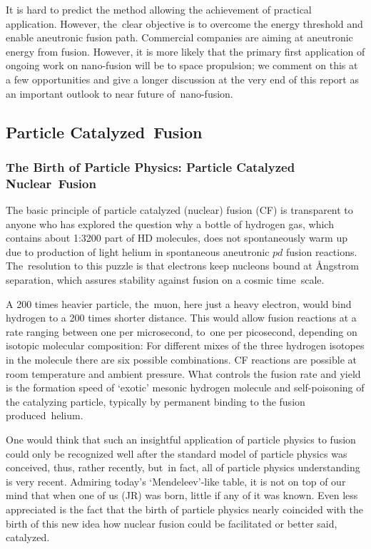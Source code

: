 \documentclass[particles,article,accept,pdftex,moreauthors]{Definitions/mdpi}
\begin{document}
It is hard to predict the method allowing the achievement of practical application. However, the~clear objective is to overcome the energy threshold and enable aneutronic fusion path. Commercial companies are aiming at aneutronic energy from fusion. However, it is more likely that the primary first application of ongoing work on nano-fusion will be to space propulsion; we comment on this at a few opportunities and give a longer discussion at the very end of this report as an important outlook to near future of~nano-fusion. 

\subsection{Particle Catalyzed~Fusion}\label{ssec:INTmuCF}
\subsubsection{The Birth of Particle Physics: Particle Catalyzed Nuclear~Fusion}\label{sssec:particles}

The basic principle of particle catalyzed (nuclear) fusion (CF) is transparent to anyone who has explored the question why a bottle of hydrogen gas, which contains about 1:3200 part of HD molecules, does not spontaneously warm up due to production of light helium in spontaneous aneutronic $pd$ fusion reactions. The~resolution to this puzzle is that electrons keep nucleons bound at \AA ngstrom separation, which assures stability against fusion on a cosmic time~scale.

A 200 times heavier particle, the~muon, here just a heavy electron, would bind hydrogen to a 200 times shorter distance. This would allow fusion reactions at a rate ranging between one per microsecond, to~one per picosecond, depending on isotopic molecular composition: For different mixes of the three hydrogen isotopes in the molecule there are six possible combinations. CF reactions are possible at room temperature and ambient pressure. What controls the fusion rate and yield is the formation speed of `exotic' mesonic hydrogen molecule and self-poisoning of the catalyzing particle, typically by permanent binding to the fusion produced~helium. 

One would think that such an insightful application of particle physics to fusion could only be recognized well after the standard model of particle physics was conceived, thus, rather recently, but~in fact, all of particle physics understanding is very recent. Admiring today's `Mendeleev'-like table, it is not on top of our mind that when one of us (JR) was born, little if any of it was known. Even less appreciated is the fact that the birth of particle physics nearly coincided with the birth of this new idea how nuclear fusion could be facilitated or better said, catalyzed. 
\end{document}
